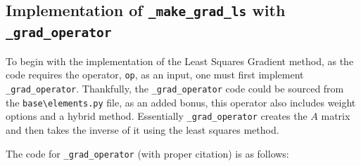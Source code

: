 \documentclass[a4paper, 12pt]{article}
\begin{document}
\subsection{Implementation of \texttt{\_make\_grad\_ls} with \texttt{\_grad\_operator}}
To begin with the implementation of the Least Squares Gradient method, as the code requires the operator, \verb|op|, as an input, one must first implement \verb|_grad_operator|. Thankfully, the \verb|_grad_operator| code could be sourced from the \verb|base\elements.py| file, as an added bonus, this operator also includes weight options and a hybrid method. Essentially \verb|_grad_operator| creates the $A$ matrix and then takes the inverse of it using the least squares method. \\\par
The code for \verb|_grad_operator| (with proper citation) is as follows:
\end{document}

